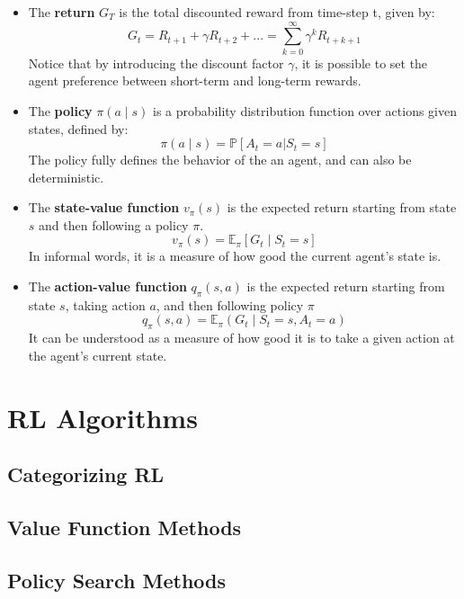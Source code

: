 \begin{itemize}
\item
	The \textbf{return} $G_T$ is the total discounted reward from time-step t, given by:
	\begin{equation}
	G_t = R_{t+1} + \gamma R_{t+2} + ... = \sum_{k=0}^{\infty}{\gamma^k R_{t+k+1}}
	\end{equation}
	Notice that by introducing the discount factor $\gamma$, it is possible to set the agent preference between short-term and long-term rewards.
\item
	The \textbf{policy} $\pi(a \mid s)$ is a probability distribution function over actions given states, defined by:
	\begin{equation}
	\pi(a \mid s) = \mathbb{P}[A_t=a | S_t=s]
	\end{equation}
	The policy fully defines the behavior of the an agent, and can also be deterministic.
\item
	The \textbf{state-value function} $v_{\pi}(s)$ is the expected return starting from state $s$ and then following a policy $\pi$.
	\begin{equation}
	v_{\pi}(s) = \mathbb{E}_{\pi}[G_t \mid S_t = s]
	\end{equation}
	In informal words, it is a measure of how good the current agent's state is.
\item
	The \textbf{action-value function} $q_{\pi}(s,a)$ is the expected return starting from state $s$, taking action $a$, and then following policy $\pi$
	\begin{equation}
	q_{\pi}(s,a) = \mathbb{E}_{\pi}(G_t \mid S_t = s, A_t = a)
	\end{equation}
	It can be understood as a measure of how good it is to take a given action at the agent's current state.
\end{itemize}

\section{RL Algorithms}

\subsection{Categorizing RL}

\subsection{Value Function Methods}

\subsection{Policy Search Methods}